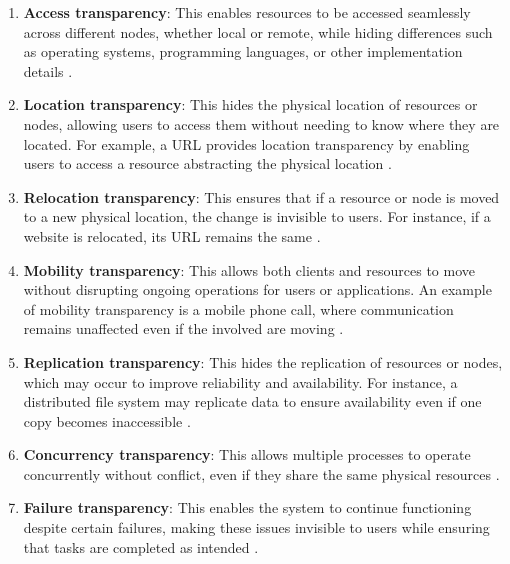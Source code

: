 \begin{enumerate}
    \item \textbf{Access transparency}: This enables resources to be accessed seamlessly across different nodes, whether local or remote, while hiding differences such as operating systems, programming languages, or other implementation details \cite{Tanenbaum2023, Coulouris2012}.
    
    \item \textbf{Location transparency}: This hides the physical location of resources or nodes, allowing users to access them without needing to know where they are located. For example, a \gls{URL} provides location transparency by enabling users to access a resource abstracting the physical location \cite{Tanenbaum2023, Banatre1991}.
    
    \item \textbf{Relocation transparency}: This ensures that if a resource or node is moved to a new physical location, the change is invisible to users. For instance, if a website is relocated, its \gls{URL} remains the same \cite{Tanenbaum2016}.
    
    \item \textbf{Mobility transparency}: This allows both clients and resources to move without disrupting ongoing operations for users or applications. An example of mobility transparency is a mobile phone call, where communication remains unaffected even if the involved are moving \cite{Coulouris2012, Tanenbaum2016}.
    
    \item \textbf{Replication transparency}: This hides the replication of resources or nodes, which may occur to improve reliability and availability. For instance, a distributed file system may replicate data to ensure availability even if one copy becomes inaccessible \cite{Tanenbaum2023}.
    
    \item \textbf{Concurrency transparency}: This allows multiple processes to operate concurrently without conflict, even if they share the same physical resources \cite{Coulouris2012}.
    
    \item \textbf{Failure transparency}: This enables the system to continue functioning despite certain failures, making these issues invisible to users while ensuring that tasks are completed as intended \cite{Coulouris2012}.
\end{enumerate}

